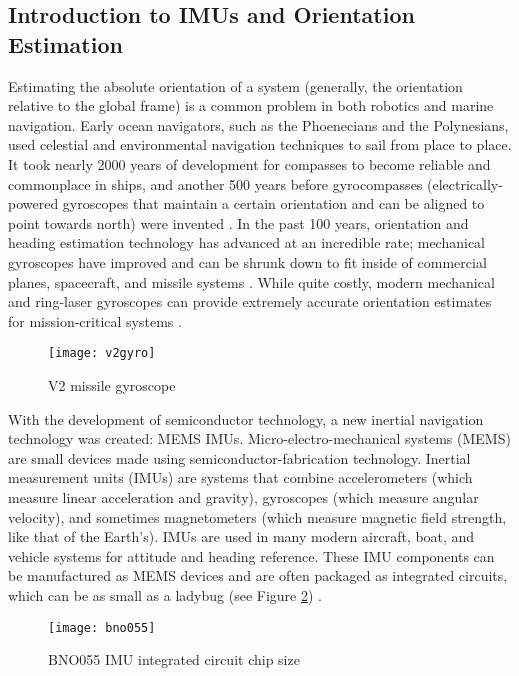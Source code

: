 \documentclass[11pt]{ucthesisCP}
\begin{document}
\subsection{Introduction to IMUs and Orientation Estimation} \label{ssec:4s1s1}
Estimating the absolute orientation of a system (generally, the orientation relative to the global frame) is a common problem in both robotics and marine navigation. Early ocean navigators, such as the Phoenecians and the Polynesians, used celestial and environmental navigation techniques to sail from place to place. It took nearly 2000 years of development for compasses to become reliable and commonplace in ships, and another 500 years before gyrocompasses (electrically-powered gyroscopes that maintain a certain orientation and can be aligned to point towards north) were invented \cite{shipscompass}. In the past 100 years, orientation and heading estimation technology has advanced at an incredible rate; mechanical gyroscopes have improved and can be shrunk down to fit inside of commercial planes, spacecraft, and missile systems \cite{v2missile}. While quite costly, modern mechanical and ring-laser gyroscopes can provide extremely accurate orientation estimates for mission-critical systems \cite{shipscompass}.

\begin{figure}[htbp]
	\centering
	\texttt{[image: v2gyro]}
	\caption{V2 missile gyroscope \cite{v2missile}}
	\label{fig:v2gyro}
\end{figure}

With the development of semiconductor technology, a new inertial navigation technology was created: MEMS IMUs. Micro-electro-mechanical systems (MEMS) are small devices made using semiconductor-fabrication technology. Inertial measurement units (IMUs) are systems that combine accelerometers (which measure linear acceleration and gravity), gyroscopes (which measure angular velocity), and sometimes magnetometers (which measure magnetic field strength, like that of the Earth’s). IMUs are used in many modern aircraft, boat, and vehicle systems for attitude and heading reference. These IMU components can be manufactured as MEMS devices and are often packaged as integrated circuits, which can be as small as a ladybug (see Figure \ref{fig:bno055}) \cite{imuadvnav}.

\begin{figure}[htbp]
	\centering
	\texttt{[image: bno055]}
	\caption{BNO055 IMU integrated circuit chip size \cite{bno055}}
	\label{fig:bno055}
\end{figure}
\end{document}
